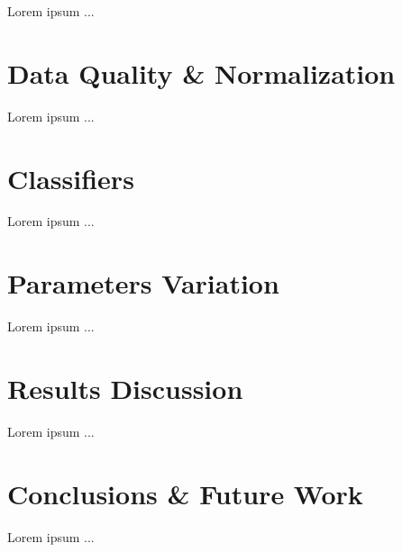 \documentclass[conference]{IEEEtran}
\begin{document}
Lorem ipsum ...



\section{Data Quality \& Normalization}

Lorem ipsum ...

\section{Classifiers}

Lorem ipsum ...

\section{Parameters Variation}

Lorem ipsum ...

\section{Results Discussion}

Lorem ipsum ...

\section{Conclusions \& Future Work}

Lorem ipsum ...





\end{document}
